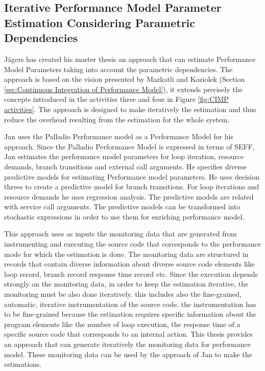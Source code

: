 \subsection{Iterative Performance Model Parameter Estimation Considering Parametric Dependencies}
\label{sec:Iterative Performance Model Parameter Estimation Considering Parametric Dependencies}
Jägers has created his master thesis \cite{jägers2018} an approach that can estimate Performance Model Parameters taking into account the parametric dependencies. The approach is based on the vision presented by Mazkatli and Koziolek (Section \ref{sec:Continuous Integration of Performance Model}), it extends precisely the concepts introduced in the activities three and four in Figure \ref{fig:CIMP activities}. The approach is designed to make iteratively the estimation and thus reduce the overhead resulting from the estimation for the whole system. 

Jan uses the Palladio Performance model as a Performance Model for his approach. Since the Palladio Performance Model is expressed in terms of SEFF, Jan estimates the performance model parameters for loop iteration, resource demands, branch transitions and external call arguments. He specifies diverse predictive models for estimating Performance model parameters. He uses decision threes to create a predictive model for branch transitions. For loop iterations and resource demands he uses regression analysis. The predictive models are related with service call arguments. The predictive models can be transformed into stochastic expressions in order to use them for enriching performance model.

This approach uses as inputs the monitoring data that are generated from instrumenting and executing the source code that corresponds to the performance mode for which the estimation is done. The monitoring data are structured in records that contain diverse information about diverse source code elements like loop record, branch record response time record etc. Since the execution depends strongly on the monitoring data, in order to keep the estimation iterative, the monitoring must be also done iteratively. this includes also the fine-grained, automatic, iterative instrumentation of the source code. the instrumentation has to be fine-grained because the estimation requires specific information about the program elements like the number of loop execution, the response time of a specific source code that corresponds to an internal action. This thesis provides an approach that can generate iteratively the monitoring data for performance model. These monitoring data can be used by the approach of Jan to make the estimations.







